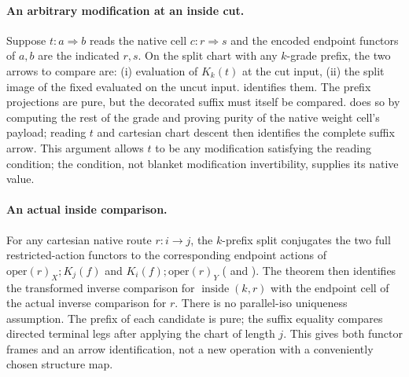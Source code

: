\documentclass[10pt]{article}
\begin{document}
\paragraph{An arbitrary modification at an inside cut.}
Suppose $t:a\Rightarrow b$ reads the native cell $c:r\Rightarrow s$ and the encoded endpoint functors of $a,b$ are the indicated $r,s$. On the split chart with any $k$-grade prefix, the two arrows to compare are: (i) evaluation of $K_k(t)$ at the cut input, (ii) the split image of the fixed  evaluated on the uncut input.  identifies them. The prefix projections are pure, but the decorated suffix must itself be compared.  does so by computing the rest of the grade and proving purity of the native weight cell's payload; reading $t$ and cartesian chart descent then identifies the complete suffix arrow. This argument allows $t$ to be any modification satisfying the reading condition; the condition, not blanket modification invertibility, supplies its native value.

\paragraph{An actual inside comparison.}
For any cartesian native route $r:i\to j$, the $k$-prefix split conjugates the two full restricted-action functors to the corresponding endpoint actions of $\mathrm{oper}(r)_X;K_j(f)$ and $K_i(f);\mathrm{oper}(r)_Y$ ( and ). The theorem  then identifies the transformed inverse comparison for $\operatorname{inside}(k,r)$ with the endpoint cell of the actual inverse comparison for $r$. There is no parallel-iso uniqueness assumption. The prefix of each candidate is pure; the suffix equality compares directed terminal legs after applying the chart of length $j$. This gives both functor frames and an arrow identification, not a new operation with a conveniently chosen structure map.
\end{document}
